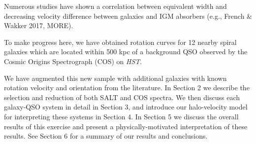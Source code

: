 \documentclass[iop]{emulateapj-rtx4}
\begin{document}

Numerous studies have shown a correlation between equivalent width and decreasing velocity difference between galaxies and IGM absorbers (e.g., French \& Wakker 2017, MORE).

To make progress here, we have obtained rotation curves for 12 nearby spiral galaxies which are located within 500 kpc of a background QSO observed by the Cosmic Origins Spectrograph (COS) on \textit{HST}. 

We have augmented this new sample with additional galaxies with known rotation velocity and orientation from the literature. In Section 2 we describe the selection and reduction of both SALT and COS spectra. We then discuss each galaxy-QSO system in detail in Section 3, and introduce our halo-velocity model for interpreting these systems in Section 4. In Section 5 we discuss the overall results of this exercise and present a physically-motivated interpretation of these results. See Section 6 for a summary of our results and conclusions.
\end{document}
